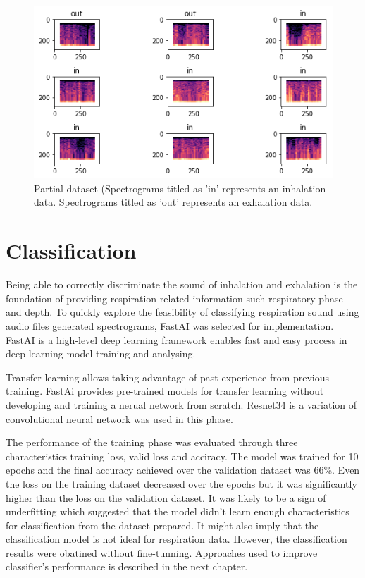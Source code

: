 \begin{figure}[h]
    \centerline{\includegraphics[scale=0.8]{figures/dataset.png}}
    \caption{Partial dataset (Spectrograms titled as 'in' represents an inhalation data. Spectrograms titled as 'out' represents an exhalation data.}
    \label{fig:dataset}
\end{figure}

\section{Classification}
Being able to correctly discriminate the sound of inhalation and exhalation is the foundation of providing respiration-related information such respiratory phase and depth. To quickly explore the feasibility of classifying respiration sound using audio files generated spectrograms, FastAI was selected for implementation. FastAI is a high-level deep learning framework enables fast and easy process in deep learning model training and analysing. 

Transfer learning allows taking advantage of past experience from previous training. FastAi provides pre-trained models for transfer learning without developing and training a nerual network from scratch. Resnet34 is a variation of convolutional neural network was used in this phase. \cite{He2016DeepRecognition}

The performance of the training phase was evaluated through three characteristics training loss, valid loss and acciracy. The model was trained for 10 epochs and the final accuracy achieved over the validation dataset was 66\%. Even the loss on the training dataset decreased over the epochs but it was significantly higher than the loss on the validation dataset. It was likely to be a sign of underfitting which suggested that the model didn't learn enough characteristics for classification from the dataset prepared. It might also imply that the classification model is not ideal for respiration data. However, the classification results were obatined without fine-tunning. Approaches used to improve classifier's performance is described in the next chapter. 

